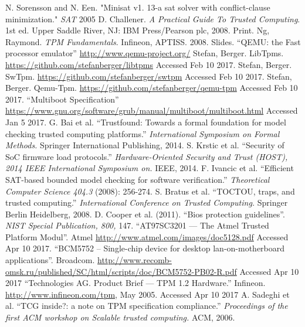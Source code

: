 \documentclass[12pt,lot, lof]{puthesis}
\begin{document}
\begin{flushleft}
\begin{footnotesize}
\begin{thebibliography}{\kern\bibindent}
    N. Sorensson and N. Een. "Minisat v1. 13-a sat solver with conflict-clause minimization." \textit{SAT} 2005 
    D. Challener. \textit{A Practical Guide To Trusted Computing}. 1st ed. Upper Saddle River, NJ: IBM Press/Pearson plc, 2008. Print.
    Ng, Raymond. \textit{TPM Fundamentals}. Infineon, APTISS. 2008. Slides.
    ``QEMU: the Fast processor emulator'' \url{http://www.qemu-project.org/}
    Stefan, Berger. LibTpms. \url{https://github.com/stefanberger/libtpms} Accessed Feb 10 2017.
    Stefan, Berger. SwTpm. \url{https://github.com/stefanberger/swtpm} Accessed Feb 10 2017.
    Stefan, Berger. Qemu-Tpm. \url{https://github.com/stefanberger/qemu-tpm} Accessed Feb 10 2017.
    ``Multiboot Specification'' \url{https://www.gnu.org/software/grub/manual/multiboot/multiboot.html} Accessed Jan 5 2017.  
    G. Bai et al. ``Trustfound: Towards a formal foundation for model checking trusted computing platforms.'' \textit{International Symposium on Formal Methods.} Springer International Publishing, 2014.
    S. Krstic et al. ``Security of SoC firmware load protocols.''
    \textit{Hardware-Oriented Security and Trust (HOST), 2014 IEEE International Symposium on.} IEEE, 2014.
    F. Ivancic et al. ``Efficient SAT-based bounded model checking for software verification.'' \textit{Theoretical Computer Science 404.3} (2008): 256-274.
    S. Bratus et al. ``TOCTOU, traps, and trusted computing.'' \textit{International Conference on Trusted Computing.} Springer Berlin Heidelberg, 2008.
    D. Cooper et al. (2011). ``Bios protection guidelines''. \textit{NIST Special Publication, 800,} 147.
     ``AT97SC3201 — The Atmel Trusted Platform Modul''. Atmel \url{http://www.atmel.com/images/doc5128.pdf} Accessed Apr 10 2017.
``BCM5752 -- Single-chip device for desktop lan-on-motherboard applications''. Broadcom. \url{http://www.recomb-omsk.ru/published/SC/html/scripts/doc/BCM5752-PB02-R.pdf} Accessed Apr 10 2017
     ``Technologies AG. Product Brief — TPM 1.2 Hardware.'' Infineon. \url{http://www.infineon.com/tpm}, May 2005. Accessed Apr 10 2017
    A. Sadeghi et al. ``TCG inside?: a note on TPM specification compliance.'' \textit{Proceedings of the first ACM workshop on Scalable trusted computing.} ACM, 2006.

\end{thebibliography}
\end{footnotesize}
\end{flushleft}
\end{document}
